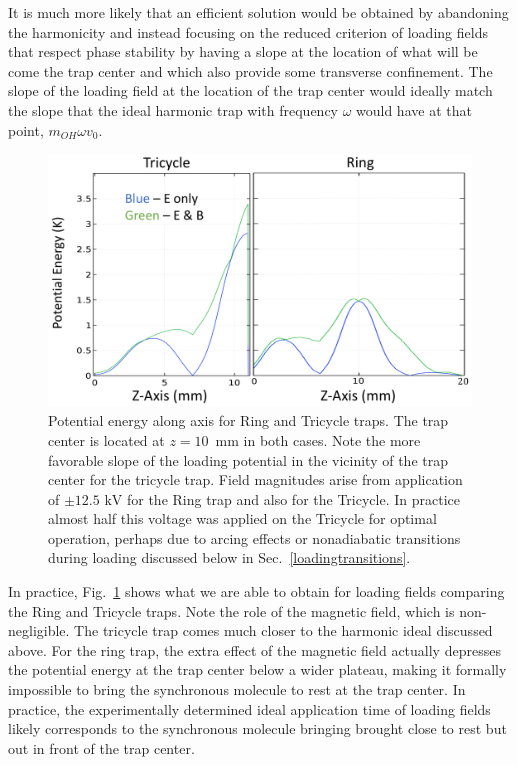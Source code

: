 \documentclass[defaultstyle,11pt]{thesis}
\begin{document}
It is much more likely that an efficient solution would be obtained by abandoning the harmonicity and instead focusing on the reduced criterion of loading fields that respect phase stability by having a slope at the location of what will be come the trap center and which also provide some transverse confinement.
The slope of the loading field at the location of the trap center would ideally match the slope that the ideal harmonic trap with frequency $\omega$ would have at that point, $m_{OH}\omega v_0$.

\begin{figure}[t!]
\centering
\includegraphics[width=14cm]{LoadingFieldsEB.png}
\caption[On-Axis Loading for Ring and Tricycle]{\label{loadingringtrike}
Potential energy along axis for Ring and Tricycle traps. The trap center is located at $z=10$~mm in both cases. Note the more favorable slope of the loading potential in the vicinity of the trap center for the tricycle trap. Field magnitudes arise from application of $\pm12.5\text{ kV}$ for the Ring trap and also for the Tricycle. In practice almost half this voltage was applied on the Tricycle for optimal operation, perhaps due to arcing effects or nonadiabatic transitions during loading discussed below in Sec.~\ref{loadingtransitions}.
}
\end{figure}

In practice, Fig.~\ref{loadingringtrike} shows what we are able to obtain for loading fields comparing the Ring and Tricycle traps.
Note the role of the magnetic field, which is non-negligible.
The tricycle trap comes much closer to the harmonic ideal discussed above.
For the ring trap, the extra effect of the magnetic field actually depresses the potential energy at the trap center below a wider plateau, making it formally impossible to bring the synchronous molecule to rest at the trap center.
In practice, the experimentally determined ideal application time of loading fields likely corresponds to the synchronous molecule bringing brought close to rest but out in front of the trap center.
\end{document}
